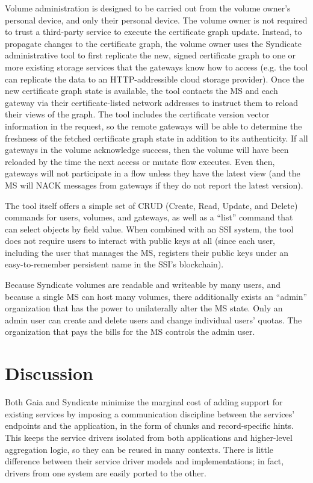 Volume administration is designed to be carried out from the volume owner's
personal device, and only their personal device.  The volume owner is not
required to trust a third-party service to execute the certificate graph update.
Instead, to propagate changes
to the certificate graph, the volume owner uses the Syndicate
administrative tool to first replicate the new, signed certificate graph to one or more
existing storage services that the gateways know how to access (e.g. the tool
can replicate the data to an HTTP-addressible cloud storage provider).  Once the
new certificate graph state is available, the tool contacts the MS and
each gateway via their certificate-listed network
addresses to instruct them to reload their views of the graph.  The tool includes the
certificate version vector information in the request, so the remote gateways will be able to
determine the freshness of the fetched certificate graph state in addition to
its authenticity.  If all gateways in the volume acknowledge success, then the
volume will have been reloaded by the time the next access or mutate flow
executes.  Even then, gateways will not participate in a flow unless they have
the latest view (and the MS will NACK messages from gateways if they do not
report the latest version).

The tool itself offers a simple set of CRUD (Create, Read, Update,
and Delete) commands for users, volumes, and
gateways, as well as a ``list'' command that can select objects by field value.
When combined with an SSI system, the tool does not require users to interact with
public keys at all (since each user, including the user that manages the MS,
registers their public keys under an easy-to-remember persistent name in the
SSI's blockchain).

Because Syndicate volumes are readable and writeable by many users, and because
a single MS can host many volumes, there additionally exists an ``admin''
organization that has the power to unilaterally alter the MS state.  Only an
admin user can create and delete users and change individual users' quotas.
The organization that pays the bills for the MS controls the admin user.

\section{Discussion}

Both Gaia and Syndicate minimize the marginal cost of adding support for
existing services by imposing a communication discipline between the services'
endpoints and the application, in the form of chunks and record-specific hints.
This keeps the service drivers isolated from both applications and higher-level
aggregation logic, so they can be reused in many contexts.  There is little
difference between their service driver models and implementations; in fact,
drivers from one system are easily ported to the other.

